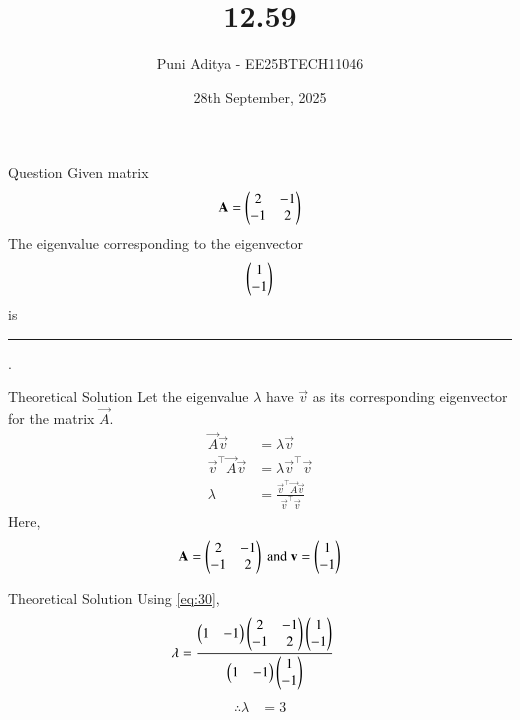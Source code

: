 \documentclass{beamer}
\title{12.59}
\date{28th September, 2025}
\author{Puni Aditya - EE25BTECH11046}
\begin{document}
\frame{\titlepage}
\begin{frame}{Question}
Given matrix
\begin{align*}
    \mathbf{A} = \begin{pmatrix}2 & -1 \\ -1 & 2\end{pmatrix}
\end{align*}
The eigenvalue corresponding to the eigenvector
\begin{align*}
    \begin{pmatrix}1 \\ -1\end{pmatrix}
\end{align*}
is \rule{2cm}{0.4pt}.
\end{frame}

\begin{frame}{Theoretical Solution}
Let the eigenvalue $\lambda$ have $\vec{v}$ as its corresponding eigenvector for the matrix $\vec{A}$.
\begin{align}
    \vec{A}\vec{v} &= \lambda\vec{v} \\
    \vec{v}^\top\vec{A}\vec{v} &= \lambda\vec{v}^\top\vec{v} \\
    \lambda &= \frac{\vec{v}^\top\vec{A}\vec{v}}{\vec{v}^\top\vec{v}} \label{eq:30}
\end{align}
Here,
\begin{align}
    \mathbf{A} = \begin{pmatrix}2 & -1 \\ -1 & 2\end{pmatrix}\text{ and }\mathbf{v} = \begin{pmatrix}1 \\ -1\end{pmatrix}
\end{align}
\end{frame}

\begin{frame}{Theoretical Solution}
Using \eqref{eq:30},
\begin{align}
    \lambda &= \frac{\begin{pmatrix}1 & -1\end{pmatrix}\begin{pmatrix}2 & -1 \\ -1 & 2\end{pmatrix}\begin{pmatrix}1 \\ -1\end{pmatrix}}{\begin{pmatrix}1 & -1\end{pmatrix}\begin{pmatrix}1 \\ -1\end{pmatrix}}
\end{align}
\begin{align}
    \therefore \lambda &= 3
\end{align}
\end{frame}
\end{document}
